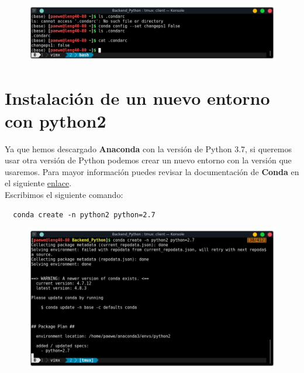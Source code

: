 \documentclass{article}
\begin{document}
\begin{figure}[h!]
  \centering
  \includegraphics[scale=0.75]{./Pictures/009_changeps1_false.png}
\end{figure}

\newpage

\section{Instalación de un nuevo entorno con python2}%

Ya que hemos descargado \textbf{Anaconda} con la versión de Python 3.7, si
queremos usar otra versión de Python podemos crear un nuevo entorno con la
versión que usaremos. Para mayor información puedes revisar la documentación de
\textbf{Conda} en el siguiente
\href{https://docs.conda.io/projects/conda/en/latest/user-guide/tasks/manage-environments.html#creating-an-environment-with-commands}{enlace}.\\

Escribimos el siguiente comando:

\begin{verbatim}
  conda create -n python2 python=2.7
\end{verbatim}

\begin{figure}[h!]
  \centering
  \includegraphics[scale=0.75]{./Pictures/001_crear_env_python2.png}
\end{figure}
\end{document}
